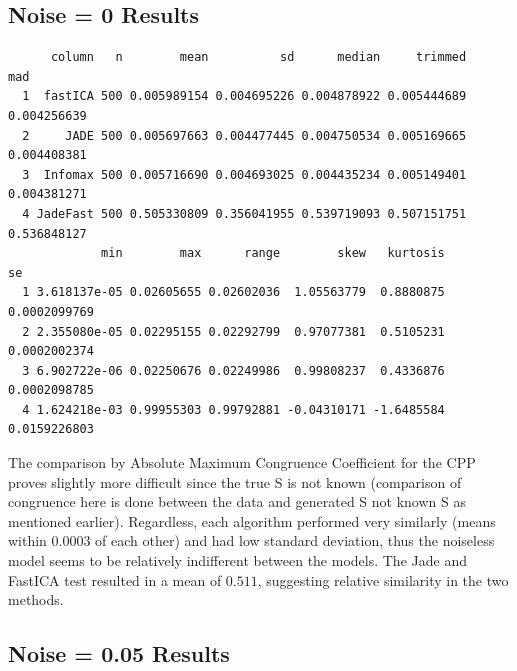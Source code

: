 \documentclass[12pt,twoside]{amherstthesis}
\begin{document}
\begin{Shaded}
\begin{Highlighting}[]
  \NormalTok{  \}}
    \NormalTok{(}
  \NormalTok{\}}
  \StringTok{ }\NormalTok{) }
  \StringTok{ }\NormalTok{) }
  \StringTok{ }\NormalTok{)  }
  \StringTok{ }\NormalTok{)}
  \end{Highlighting}
  \end{Shaded}
  
  \subsection{Noise = 0 Results}\label{noise-0-results-1}
  
  \begin{verbatim}
      column   n        mean          sd      median     trimmed         mad
  1  fastICA 500 0.005989154 0.004695226 0.004878922 0.005444689 0.004256639
  2     JADE 500 0.005697663 0.004477445 0.004750534 0.005169665 0.004408381
  3  Infomax 500 0.005716690 0.004693025 0.004435234 0.005149401 0.004381271
  4 JadeFast 500 0.505330809 0.356041955 0.539719093 0.507151751 0.536848127
             min        max      range        skew   kurtosis           se
  1 3.618137e-05 0.02605655 0.02602036  1.05563779  0.8880875 0.0002099769
  2 2.355080e-05 0.02295155 0.02292799  0.97077381  0.5105231 0.0002002374
  3 6.902722e-06 0.02250676 0.02249986  0.99808237  0.4336876 0.0002098785
  4 1.624218e-03 0.99955303 0.99792881 -0.04310171 -1.6485584 0.0159226803
  \end{verbatim}
  
  The comparison by Absolute Maximum Congruence Coefficient for the CPP
  proves slightly more difficult since the true S is not known (comparison
  of congruence here is done between the data and generated S not known S
  as mentioned earlier). Regardless, each algorithm performed very
  similarly (means within 0.0003 of each other) and had low standard
  deviation, thus the noiseless model seems to be relatively indifferent
  between the models. The Jade and FastICA test resulted in a mean of
  \(0.511\), suggesting relative similarity in the two methods.
  
  \subsection{Noise = 0.05 Results}\label{noise-0.05-results-1}
  
\end{document}
